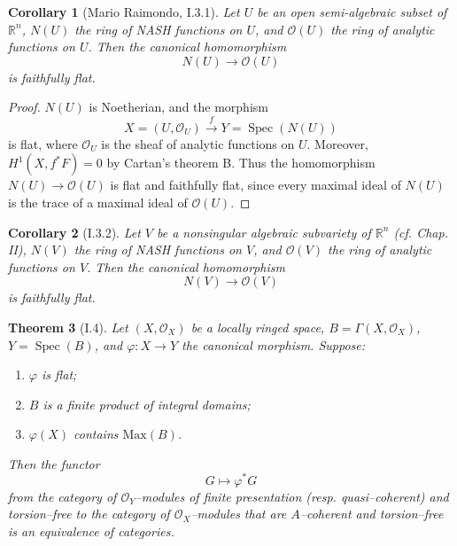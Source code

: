 \documentclass[a4paper]{amsart}
\newtheorem{theorem}{Theorem}[section]
\newtheorem{cor}[theorem]{Corollary}
\theoremstyle{definition}
\theoremstyle{definition}
\begin{document}
\begin{cor}[Mario Raimondo, I.3.1]
Let $U$ be an open semi-algebraic subset of $\mathbb{R}^n$, $N(U)$ the ring of NASH functions on $U$, and $\mathcal{O}(U)$ the ring of analytic functions on $U$. Then the canonical homomorphism
\[
N(U) \longrightarrow \mathcal{O}(U)
\]
is faithfully flat.
\end{cor}

\begin{proof}
$N(U)$ is Noetherian, and the morphism
\[
X = (U, \mathcal{O}_U) \xrightarrow{f} Y = \operatorname{Spec}(N(U))
\]
is flat, where $\mathcal{O}_U$ is the sheaf of analytic functions on $U$. Moreover, $H^1(X, f^*F) = 0$ by Cartan’s theorem B. Thus the homomorphism $N(U) \to \mathcal{O}(U)$ is flat and faithfully flat, since every maximal ideal of $N(U)$ is the trace of a maximal ideal of $\mathcal{O}(U)$.
\end{proof}

\begin{cor}[I.3.2]
Let $V$ be a nonsingular algebraic subvariety of $\mathbb{R}^n$ (cf. Chap. II), $N(V)$ the ring of NASH functions on $V$, and $\mathcal{O}(V)$ the ring of analytic functions on $V$. Then the canonical homomorphism
\[
N(V) \longrightarrow \mathcal{O}(V)
\]
is faithfully flat.
\end{cor}

\begin{theorem}[I.4]
Let $(X, \mathcal{O}_X)$ be a locally ringed space, $B = \Gamma(X, \mathcal{O}_X)$, $Y = \operatorname{Spec}(B)$, and $\varphi : X \to Y$ the canonical morphism. Suppose:
\begin{enumerate}
\item $\varphi$ is flat;
\item $B$ is a finite product of integral domains;
\item $\varphi(X)$ contains $\mathrm{Max}(B)$.
\end{enumerate}
Then the functor
\[
G \longmapsto \varphi^* G
\]
from the category of $\mathcal{O}_Y$–modules of finite presentation (resp. quasi–coherent) and torsion–free to the category of $\mathcal{O}_X$–modules that are $A$–coherent and torsion–free is an equivalence of categories.
\end{theorem}
\end{document}
